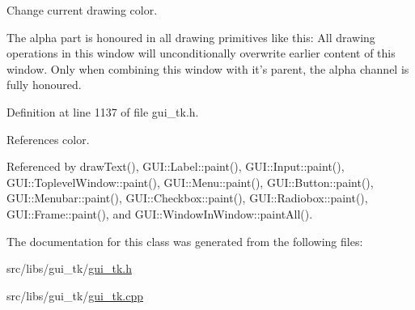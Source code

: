 Change current drawing color. 

The alpha part is honoured in all drawing primitives like this\-: All drawing operations in this window will unconditionally overwrite earlier content of this window. Only when combining this window with it's parent, the alpha channel is fully honoured. 

Definition at line 1137 of file gui\-\_\-tk.\-h.



References color.



Referenced by draw\-Text(), G\-U\-I\-::\-Label\-::paint(), G\-U\-I\-::\-Input\-::paint(), G\-U\-I\-::\-Toplevel\-Window\-::paint(), G\-U\-I\-::\-Menu\-::paint(), G\-U\-I\-::\-Button\-::paint(), G\-U\-I\-::\-Menubar\-::paint(), G\-U\-I\-::\-Checkbox\-::paint(), G\-U\-I\-::\-Radiobox\-::paint(), G\-U\-I\-::\-Frame\-::paint(), and G\-U\-I\-::\-Window\-In\-Window\-::paint\-All().



The documentation for this class was generated from the following files\-:\begin{DoxyCompactItemize}
\item 
src/libs/gui\-\_\-tk/\hyperlink{gui__tk_8h}{gui\-\_\-tk.\-h}\item 
src/libs/gui\-\_\-tk/\hyperlink{gui__tk_8cpp}{gui\-\_\-tk.\-cpp}\end{DoxyCompactItemize}
